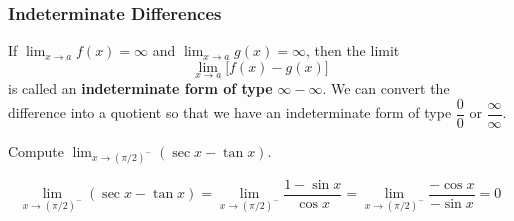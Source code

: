 \subsubsection*{Indeterminate Differences}
If \(\displaystyle{\lim_{x\to a}f(x)=\infty}\) and
\(\displaystyle{\lim_{x\to a}g(x)=\infty}\), then the limit
\[\lim_{x\to a}\big[f(x)-g(x)\big]\]
is called an \textbf{indeterminate form of type} \(\infty-\infty\).
We can convert the difference into a quotient so that we have an indeterminate
form of type \(\dfrac{0}{0}\) or \(\dfrac{\infty}{\infty}\).
\begin{problem}
    Compute \(\displaystyle{\lim_{x\to (\pi/2)^-}(\sec x-\tan x)}\).
\end{problem}
\begin{solution}
    \[\lim_{x\to (\pi/2)^-}(\sec x-\tan x)
    =\lim_{x\to (\pi/2)^-}\frac{1-\sin x}{\cos x}
    =\lim_{x\to (\pi/2)^-}\frac{-\cos x}{-\sin x}=0\]
\end{solution}

